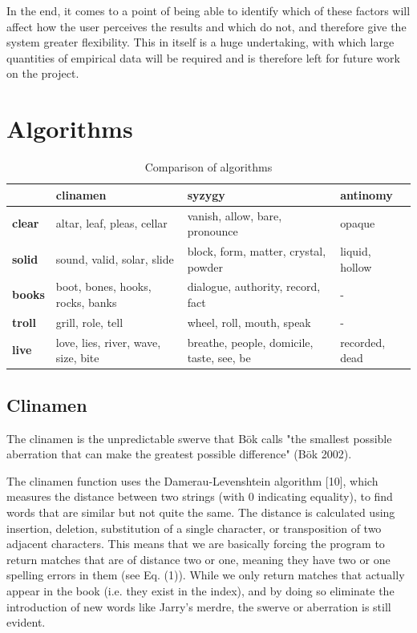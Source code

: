 In the end, it comes to a point of being able to identify which of these factors will affect how the user perceives the results and which do not, and therefore give the system greater flexibility. This in itself is a huge undertaking, with which large quantities of empirical data will be required and is therefore left for future work on the project.

\section{Algorithms}

\begin{table}[htb]
  \begin{tabu}{X[1]|X[3]X[3]X[2]}
  \toprule
  &
  \textbf{clinamen}
  &
  \textbf{syzygy}
  &
  \textbf{antinomy}
  \\ \midrule
  \textbf{clear}
  &
  altar, leaf, pleas, cellar
  &
  vanish, allow, bare, pronounce
  &
  opaque
  \\ \midrule
  \textbf{solid}
  &
  sound, valid, solar, slide
  &
  block, form, matter, crystal, powder
  &
  liquid, hollow
  \\ \midrule
  \textbf{books}
  &
  boot, bones, hooks, rocks, banks
  &
  dialogue, authority, record, fact
  &
  -
  \\ \midrule
  \textbf{troll}
  &
  grill, role, tell
  &
  wheel, roll, mouth, speak
  &
  -
  \\ \midrule
  \textbf{live}
  &
  love, lies, river, wave, size, bite
  &
  breathe, people, domicile, taste, see, be
  &
  recorded, dead
  \\ \bottomrule
  \end{tabu}
\caption[Comparison of algorithms]{Comparison of algorithms}
\label{algorithmscomp}
\end{table}

\subsection{Clinamen}

The clinamen is the unpredictable swerve that Bök calls "the smallest possible aberration that can make the greatest possible difference" (Bök 2002).

The clinamen function uses the Damerau-Levenshtein algorithm [10], which measures the distance between two strings (with 0 indicating equality), to find words that are similar but not quite the same. The distance is calculated using insertion, deletion, substitution of a single character, or transposition of two adjacent characters. This means that we are basically forcing the program to return matches that are of distance two or one, meaning they have two or one spelling errors in them (see Eq. (1)). While we only return matches that actually appear in the book (i.e. they exist in the index), and by doing so eliminate the introduction of new words like Jarry's merdre, the swerve or aberration is still evident.

